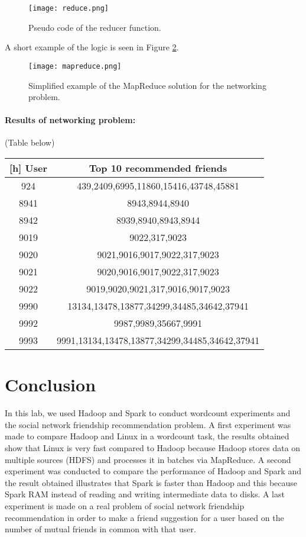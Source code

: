 \documentclass[12pt]{article}
\begin{document}
\begin{figure}[h]
  \centering
  \texttt{[image: reduce.png]}
  \caption{Pseudo code of the reducer function.}
  \label{fig:reduce}
\end{figure}

A short example of the logic is seen in Figure \ref{fig:mapreduce}.

\begin{figure}[h]
  \centering
  \texttt{[image: mapreduce.png]}
  \caption{Simplified example of the MapReduce solution for the networking problem.}
  \label{fig:mapreduce}
\end{figure}

\paragraph{Results of networking problem:} (Table below)

\begin{center}
\begin{tabular}{c|c}[h]
  User & Top 10 recommended friends\\
  \hline\hline
  924  &   439,2409,6995,11860,15416,43748,45881\\
  8941  &  8943,8944,8940\\
  8942   & 8939,8940,8943,8944\\
  9019  &  9022,317,9023\\
  9020   & 9021,9016,9017,9022,317,9023\\
  9021   & 9020,9016,9017,9022,317,9023\\
  9022   & 9019,9020,9021,317,9016,9017,9023\\
  9990   & 13134,13478,13877,34299,34485,34642,37941\\
  9992  &  9987,9989,35667,9991\\
  9993  &  9991,13134,13478,13877,34299,34485,34642,37941\\  
\end{tabular}
\end{center}
\section{Conclusion}
In this lab, we used Hadoop and Spark to conduct wordcount experiments and the social network friendship recommendation problem. A first experiment was made to compare Hadoop and Linux in a wordcount task, the results obtained show that Linux is very fast compared to Hadoop because Hadoop stores data on multiple sources (HDFS) and processes it in batches via MapReduce.
A second experiment was conducted to compare the performance of Hadoop and Spark and the result obtained illustrates that Spark is faster than Hadoop and this because Spark RAM instead of reading and writing intermediate data to disks.
A last experiment is made on a real problem of social network friendship recommendation in order to make a friend suggestion for a user based on the number of mutual friends in common with that user.



 
\end{document}
